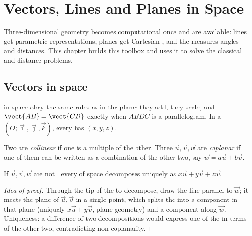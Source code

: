 \chapter{Vectors, Lines and Planes in Space}\label{ch:g12:space}

Three-dimensional geometry becomes computational once  and
 are available: lines get parametric representations, planes get
Cartesian , and the  measures angles and distances.
This chapter builds this toolbox and uses it to solve the classical
 and distance problems.

\section{Vectors in space}

 in space obey the same rules as in the plane: they add, they scale,
and $\vect{AB} = \vect{CD}$ exactly when $ABDC$ is a parallelogram. In a
 $(O; \vec\imath, \vec\jmath, \vec k)$, every  has
 $(x, y, z)$.

\begin{definition}\label{def:g12:space:collinear}
Two  are \emph{collinear} if one is a multiple of the other. Three
 $\vec u, \vec v, \vec w$ are \emph{coplanar} if one
of them can be written as a combination of the other two, say
$\vec w = a\vec u + b\vec v$.
\end{definition}

\begin{proposition}\label{prop:g12:space:basis}
If $\vec u, \vec v, \vec w$ are not , every  of space
decomposes uniquely as $x\vec u + y\vec v + z\vec w$.
\end{proposition}

\begin{proof}[Idea of proof]
Through the tip of the  to decompose, draw the line parallel to
$\vec w$; it meets the plane of $\vec u, \vec v$ in a single point, which
splits the  into a component in that plane (uniquely $x\vec u + y\vec
v$, plane geometry) and a component along $\vec w$. Uniqueness: a difference
of two decompositions would express one of the  in terms of the other
two, contradicting non-coplanarity.
\end{proof}

